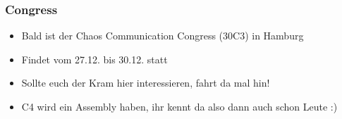 \documentclass[ngerman,compress]{beamer}
\begin{document}
\begin{frame}
	\frametitle{Congress}
	\begin{itemize}
		\item Bald ist der Chaos Communication Congress (30C3) in Hamburg
		\item Findet vom 27.12. bis 30.12. statt
		\item Sollte euch der Kram hier interessieren, fahrt da mal hin!
		\item C4 wird ein Assembly haben, ihr kennt da also dann auch schon Leute :)
	\end{itemize}
\end{frame}
\end{document}
